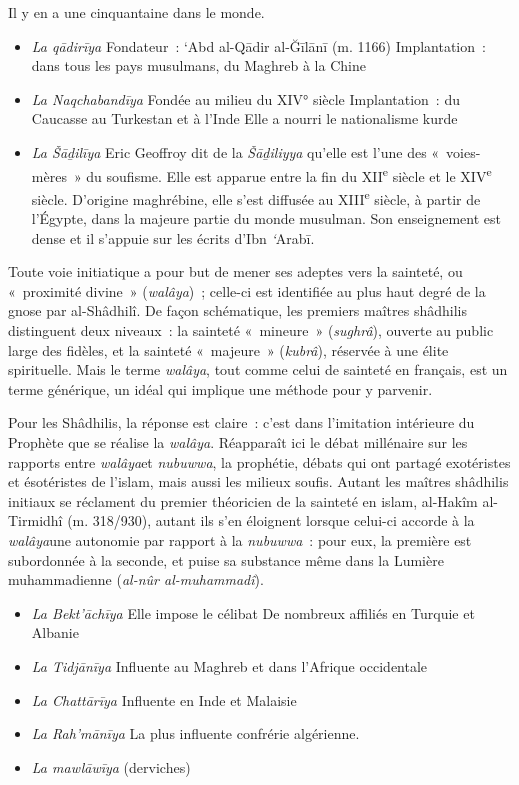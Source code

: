 Il y en a une cinquantaine dans le monde.

\begin{itemize}
\item
  \textit{La qādirīya}
Fondateur~: `Abd al-Qādir al-Ğīlānī (m. 1166)
Implantation~: dans tous les pays musulmans, du Maghreb à la Chine


\item
  \textit{La Naqchabandīya}
Fondée au milieu du XIV° siècle
Implantation~: du Caucasse au Turkestan et à l'Inde
Elle a nourri le nationalisme kurde


\item
  \textit{La Šāḏilīya}
Eric Geoffroy dit de la \emph{Šāḏiliyya} qu'elle est l'une des
«~voies-mères~» du soufisme. Elle est apparue entre la fin du
XII\textsuperscript{e} siècle et le XIV\textsuperscript{e} siècle.
D'origine maghrébine, elle s'est diffusée au XIII\textsuperscript{e}
siècle, à partir de l'Égypte, dans la majeure partie du monde musulman.
Son enseignement est dense et il s'appuie sur les écrits d'Ibn
\emph{`}Arabī.
\end{itemize}
Toute voie initiatique a pour but de mener ses adeptes vers la sainteté,
ou «~proximité divine~» (\emph{walâya})~; celle-ci est identifiée au
plus haut degré de la gnose par al-Shâdhilî. De façon schématique, les
premiers maîtres shâdhilis distinguent deux niveaux~: la sainteté
«~mineure~» (\emph{sughrâ}), ouverte au public large des fidèles, et la
sainteté «~majeure~» (\emph{kubrâ}), réservée à une élite spirituelle.
Mais le terme \emph{walâya}, tout comme celui de sainteté en français,
est un terme générique, un idéal qui implique une méthode pour y
parvenir.

Pour les Shâdhilis, la réponse est claire~: c'est dans l'imitation
intérieure du Prophète que se réalise la \emph{walâya}. Réapparaît ici
le débat millénaire sur les rapports entre \emph{walâya}et
\emph{nubuwwa}, la prophétie, débats qui ont partagé exotéristes et
ésotéristes de l'islam, mais aussi les milieux soufis. Autant les
maîtres shâdhilis initiaux se réclament du premier théoricien de la
sainteté en islam, al-Hakîm al-Tirmidhî (m. 318/930), autant ils s'en
éloignent lorsque celui-ci accorde à la \emph{walâya}une autonomie par
rapport à la \emph{nubuwwa}~: pour eux, la première est subordonnée à la
seconde, et puise sa substance même dans la Lumière muhammadienne
(\emph{al-nûr al-muhammadî}).

\begin{itemize}
\item
  \textit{La Bekt'āchīya}
Elle impose le célibat
De nombreux affiliés en Turquie et Albanie


\item
  \textit{La Tidjānīya}
Influente au Maghreb et dans l'Afrique occidentale


\item
  \textit{La Chattārīya}
Influente en Inde et Malaisie

\item
  \textit{La Rah'mānīya}
La plus influente confrérie algérienne.


\item
  \textit{La mawlāwīya} (derviches)
\end{itemize}

